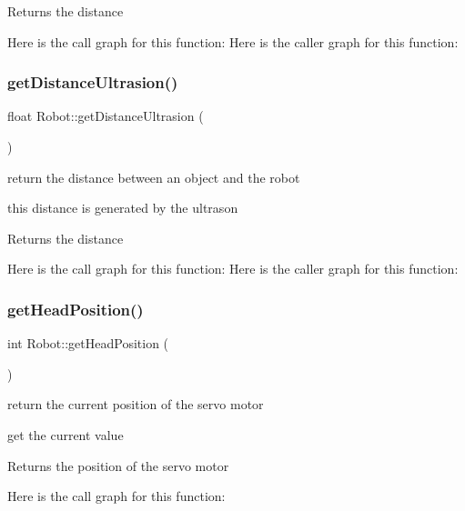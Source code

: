 \begin{DoxyReturn}{Returns}
the distance 
\end{DoxyReturn}
Here is the call graph for this function\+:
Here is the caller graph for this function\+:
\mbox{\label{class_robot_ae3e977cb38b69c31faafd993a2b4054d}} 
\subsubsection{\texorpdfstring{get\+Distance\+Ultrasion()}{getDistanceUltrasion()}}
{\footnotesize\ttfamily float Robot\+::get\+Distance\+Ultrasion (\begin{DoxyParamCaption}{ }\end{DoxyParamCaption})}



return the distance between an object and the robot 

this distance is generated by the ultrason

\begin{DoxyReturn}{Returns}
the distance 
\end{DoxyReturn}
Here is the call graph for this function\+:
Here is the caller graph for this function\+:
\mbox{\label{class_robot_a34039e49403d45d263e834f11d9c85e9}} 
\subsubsection{\texorpdfstring{get\+Head\+Position()}{getHeadPosition()}}
{\footnotesize\ttfamily int Robot\+::get\+Head\+Position (\begin{DoxyParamCaption}{ }\end{DoxyParamCaption})}



return the current position of the servo motor 

get the current value

\begin{DoxyReturn}{Returns}
the position of the servo motor 
\end{DoxyReturn}
Here is the call graph for this function\+:
\mbox{\label{class_robot_a69dad285c5a86e600b2ad94e7d30cf8b}} 
